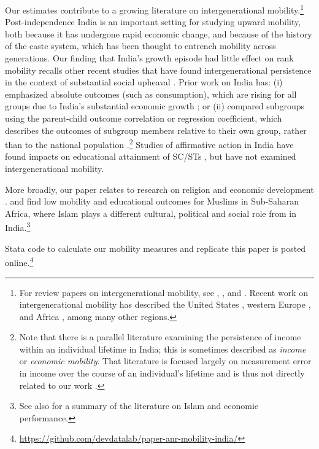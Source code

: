 \documentclass[12pt,letterpaper]{article}
\numberwithin{equation}{section}
\begin{document}
Our estimates contribute to a growing literature on intergenerational mobility.\footnote{For review papers on intergenerational mobility, see , , and . Recent work on intergenerational mobility has described the United States \cite{chetty2014b,chetty2014c,chetty2018}, western Europe \cite{bratberg2017}, and Africa \cite{alesina2018}, among many other regions.} Post-independence India is an important setting for studying upward mobility, both because it has undergone rapid economic change, and because of the history of the caste system, which has been thought to entrench mobility across generations. Our finding that India's growth episode had little effect on rank mobility recalls other recent studies that have found intergenerational persistence in the context of substantial social upheaval \cite{ager2021,alesina2020b}. Prior work on India has: (i) emphasized absolute outcomes (such as consumption), which are rising for all groups due to India's substantial economic growth \cite{maitra2009,hnatkovska2013}; or (ii) compared subgroups using the parent-child outcome correlation or regression coefficient, which describes the outcomes of subgroup members relative to their own group, rather than to the national population \cite{hnatkovska2013,emran2015,azam2015}.\footnote{Note that there is a parallel literature examining the persistence of income within an individual lifetime in India; this is sometimes described as \textit{income} or \textit{economic mobility}. That literature is focused largely on measurement error in income over the course of an individual's lifetime and is thus not directly related to our work \cite{azam2016,li2019}.} Studies of affirmative action in India have found impacts on educational attainment of SC/STs \cite{frisancho2012,bagde2016,cassan2017,khanna2020}, but have not examined intergenerational mobility.

More broadly, our paper relates to research on religion and economic development  \cite{mccleary2006,becker2009}.  and  find low mobility and educational outcomes for Muslims in Sub-Saharan Africa, where Islam plays a different cultural, political and social role from in India.\footnote{See also  for a summary of the literature on Islam and economic performance.} 

Stata code to calculate our mobility measures and replicate this paper is posted online.\footnote{\url{https://github.com/devdatalab/paper-anr-mobility-india/}} 
\end{document}
